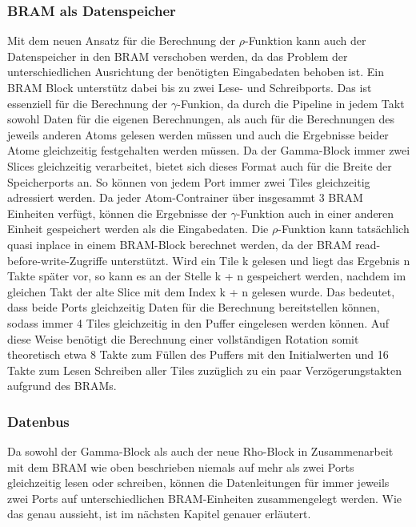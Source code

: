 \subsubsection{BRAM als Datenspeicher}
Mit dem neuen Ansatz für die Berechnung der $\rho$-Funktion kann auch der Datenspeicher in den BRAM verschoben werden,
da das Problem der unterschiedlichen Ausrichtung der benötigten Eingabedaten behoben ist. Ein BRAM Block unterstütz
dabei bis zu zwei Lese- und Schreibports. Das ist essenziell für die Berechnung der $\gamma$-Funkion,
da durch die Pipeline in jedem Takt sowohl Daten für die eigenen Berechnungen, als auch für die Berechnungen des
jeweils anderen Atoms gelesen werden müssen und auch die Ergebnisse beider Atome gleichzeitig festgehalten werden müssen.
Da der Gamma-Block immer zwei Slices gleichzeitig verarbeitet, bietet sich dieses Format auch für die Breite der Speicherports an.
So können von jedem Port immer zwei Tiles gleichzeitig adressiert werden. Da jeder Atom-Contrainer über insgesammt 3 BRAM Einheiten verfügt,
können die Ergebnisse der $\gamma$-Funktion auch in einer anderen Einheit gespeichert werden als die Eingabedaten.
Die $\rho$-Funktion kann tatsächlich quasi inplace in einem BRAM-Block berechnet werden, da der BRAM read-before-write-Zugriffe unterstützt.
Wird ein Tile k gelesen und liegt das Ergebnis n Takte später vor, so kann es an der Stelle k + n gespeichert werden,
nachdem im gleichen Takt der alte Slice mit dem Index k + n gelesen wurde. Das bedeutet, dass beide Ports gleichzeitig
Daten für die Berechnung bereitstellen können, sodass immer 4 Tiles gleichzeitig in den Puffer eingelesen werden können.
Auf diese Weise benötigt die Berechnung einer vollständigen Rotation somit theoretisch etwa 8 Takte zum Füllen des Puffers mit den Initialwerten
und 16 Takte zum Lesen Schreiben aller Tiles zuzüglich zu ein paar Verzögerungstakten aufgrund des BRAMs.

\subsubsection{Datenbus}
Da sowohl der Gamma-Block als auch der neue Rho-Block in Zusammenarbeit mit dem BRAM wie oben beschrieben
niemals auf mehr als zwei Ports gleichzeitig lesen oder schreiben,
können die Datenleitungen für immer jeweils zwei Ports auf unterschiedlichen BRAM-Einheiten zusammengelegt werden.
Wie das genau aussieht, ist im nächsten Kapitel genauer erläutert.